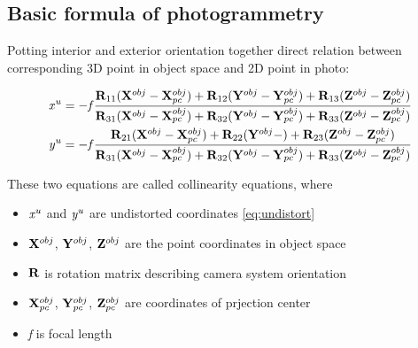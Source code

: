 \documentclass[a4paper,12pt]{report}
\newcommand{\ematr}[1]{
{\bf #1}
}
\newcommand{\evect}[1]{
{\bf #1}
}
\newcommand{\escal}[1]{
{\it #1}
}
\begin{document}
\subsection{Basic formula of photogrammetry}

Potting interior and exterior orientation together direct relation between corresponding 3D point in object space and 2D point
in photo:

\begin{equation}
\label{eq:col_eqs}
\begin{split}
&\escal{x}^{u} = -\escal{f}\frac{\ematr{R}_{11}(\evect{X}^{obj} - \evect{X}^{obj}_{pc}) + 
                                  \ematr{R}_{12}(\evect{Y}^{obj} - \evect{Y}^{obj}_{pc}) + 
                                  \ematr{R}_{13}(\evect{Z}^{obj} - \evect{Z}^{obj}_{pc})                                  
                                  }{
				  \ematr{R}_{31}(\evect{X}^{obj} - \evect{X}^{obj}_{pc}) + 
                                  \ematr{R}_{32}(\evect{Y}^{obj} - \evect{Y}^{obj}_{pc}) + 
                                  \ematr{R}_{33}(\evect{Z}^{obj} - \evect{Z}^{obj}_{pc})     
                                  } \\
&\escal{y}^{u} = -\escal{f}\frac{\ematr{R}_{21}(\evect{X}^{obj} - \evect{X}^{obj}_{pc}) + 
                                  \ematr{R}_{22}(\evect{Y}^{obj} - ) + 
                                  \ematr{R}_{23}(\evect{Z}^{obj} - \evect{Z}^{obj}_{pc})                                  
                                  }{
				  \ematr{R}_{31}(\evect{X}^{obj} - \evect{X}^{obj}_{pc}) + 
                                  \ematr{R}_{32}(\evect{Y}^{obj} - \evect{Y}^{obj}_{pc}) + 
                                  \ematr{R}_{33}(\evect{Z}^{obj} - \evect{Z}^{obj}_{pc})     
                                  }
\end{split}
\end{equation}

These two equations are called collinearity equations, where
\begin{itemize}
  \item $\escal{x}^{u}$ and $\escal{y}^{u}$ are undistorted coordinates \eqref{eq:undistort}
  \item $\evect{X}^{obj}$, $\evect{Y}^{obj}$, $\evect{Z}^{obj}$ are the point coordinates in object space
  \item $\ematr{R}$ is rotation matrix describing camera system orientation
  \item $\evect{X}^{obj}_{pc}$, $\evect{Y}^{obj}_{pc}$, $\evect{Z}^{obj}_{pc}$ are coordinates of prjection center
  \item \escal{f} is focal length
\end{itemize}
\end{document}
